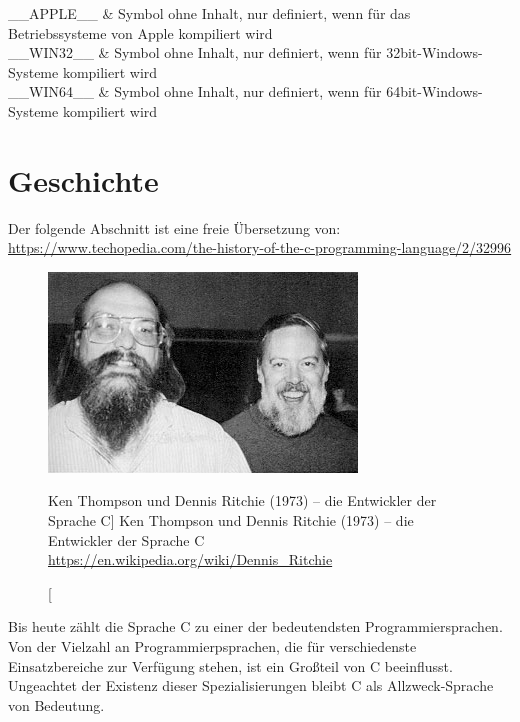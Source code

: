 \begin{appendices}
\begin{table}[h!]
\begin{tabularx}
	\_\_APPLE\_\_ &
	Symbol ohne Inhalt, nur definiert, wenn für das Betriebssysteme von Apple kompiliert wird
	\\
		
	\_\_WIN32\_\_  &
	Symbol ohne Inhalt, nur definiert, wenn für 32bit-Windows-Systeme kompiliert wird
	\\
		
	\_\_WIN64\_\_  &
	Symbol ohne Inhalt, nur definiert, wenn für 64bit-Windows-Systeme kompiliert wird
	\\
	
	\bottomrule[1.5pt]
\end{tabularx}
\caption{Vordefinierte Präprozessor-Symbole des \texttt{gcc}} \label{tab:predefinedMacros}
\end{table}

\chapter{Geschichte}
Der folgende Abschnitt ist eine freie Übersetzung von:\\
\url{https://www.techopedia.com/the-history-of-the-c-programming-language/2/32996}

\begin{figure}
	\includegraphics[width=\linewidth]{./gfx/KTDR}
	\caption%
		[Ken Thompson und Dennis Ritchie (1973) -- die Entwickler der Sprache C]
		{Ken Thompson und Dennis Ritchie (1973) -- die Entwickler der Sprache C\newline
		\url{https://en.wikipedia.org/wiki/Dennis_Ritchie}}
	\vspace{-20pt}
\end{figure}
Bis heute zählt die Sprache C zu einer der bedeutendsten Programmiersprachen. Von der Vielzahl an  Programmierpsprachen, die für verschiedenste Einsatzbereiche zur Verfügung stehen, ist ein Großteil von C beeinflusst. Ungeachtet der Existenz dieser Spezialisierungen bleibt C als Allzweck-Sprache von Bedeutung.


\end{appendices}
